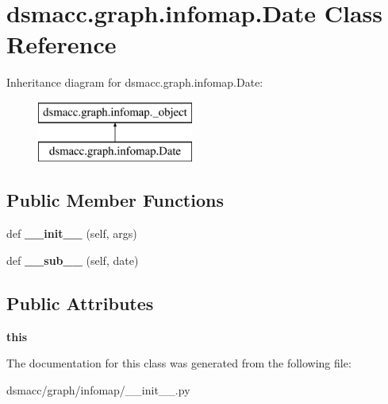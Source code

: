 \hypertarget{classdsmacc_1_1graph_1_1infomap_1_1Date}{}\section{dsmacc.\+graph.\+infomap.\+Date Class Reference}
\label{classdsmacc_1_1graph_1_1infomap_1_1Date}
Inheritance diagram for dsmacc.\+graph.\+infomap.\+Date\+:\begin{figure}[H]
\begin{center}
\leavevmode
\includegraphics[height=2.000000cm]{classdsmacc_1_1graph_1_1infomap_1_1Date}
\end{center}
\end{figure}
\subsection*{Public Member Functions}
\begin{DoxyCompactItemize}
\item 
\mbox{\label{classdsmacc_1_1graph_1_1infomap_1_1Date_a8b6dcedc226f4b3d2f980137b085d443}} 
def {\bfseries \+\_\+\+\_\+init\+\_\+\+\_\+} (self, args)
\item 
\mbox{\label{classdsmacc_1_1graph_1_1infomap_1_1Date_aef4fc415471cea72edcdd5d7a09e5e59}} 
def {\bfseries \+\_\+\+\_\+sub\+\_\+\+\_\+} (self, date)
\end{DoxyCompactItemize}
\subsection*{Public Attributes}
\begin{DoxyCompactItemize}
\item 
\mbox{\label{classdsmacc_1_1graph_1_1infomap_1_1Date_af20f386697650eed58c7dd281f239a1f}} 
{\bfseries this}
\end{DoxyCompactItemize}


The documentation for this class was generated from the following file\+:\begin{DoxyCompactItemize}
\item 
dsmacc/graph/infomap/\+\_\+\+\_\+init\+\_\+\+\_\+.\+py\end{DoxyCompactItemize}
